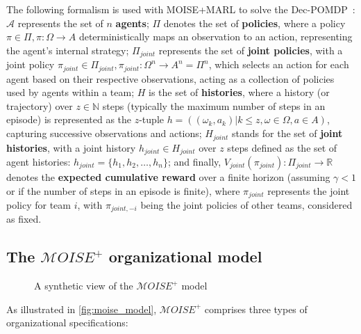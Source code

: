 \documentclass[sigconf,anonymous]{aamas}
\begin{document}
The following formalism is used with MOISE+MARL to solve the Dec-POMDP~\citep{Beynier2013,Albrecht2024}: $\mathcal{A}$ represents the set of $n$ \textbf{agents}; $\Pi$ denotes the set of \textbf{policies}, where a policy $\pi \in \Pi, \pi: \Omega \rightarrow A$ deterministically maps an observation to an action, representing the agent's internal strategy; $\Pi_{joint}$ represents the set of \textbf{joint policies}, with a joint policy $\pi_{joint} \in \Pi_{joint}, \pi_{joint}: \Omega^n \rightarrow A^n = \Pi^n$, which selects an action for each agent based on their respective observations, acting as a collection of policies used by agents within a team; $H$ is the set of \textbf{histories}, where a history (or trajectory) over $z \in \mathbb{N}$ steps (typically the maximum number of steps in an episode) is represented as the $z$-tuple $h = ((\omega_{k}, a_{k}) | k \leq z, \omega \in \Omega, a \in A)$, capturing successive observations and actions; $H_{joint}$ stands for the set of \textbf{joint histories}, with a joint history $h_{joint} \in H_{joint}$ over $z$ steps defined as the set of agent histories: $h_{joint} = \{h_1, h_2, \dots, h_n\}$; and finally, $V_{joint}(\pi_{joint}): \Pi_{joint} \rightarrow \mathbb{R}$ denotes the \textbf{expected cumulative reward} over a finite horizon (assuming $\gamma < 1$ or if the number of steps in an episode is finite), where $\pi_{joint}$ represents the joint policy for team $i$, with $\pi_{joint,-i}$ being the joint policies of other teams, considered as fixed.



\subsection{The $\mathcal{M}OISE^+$ organizational model}

\begin{figure}[h!]
    
    \caption{A synthetic view of the $\mathcal{M}OISE^+$ model}
    \label{fig:moise_model}
\end{figure}

As illustrated in \autoref{fig:moise_model}, $\mathcal{M}OISE^+$ comprises three types of organizational specifications:
\end{document}
